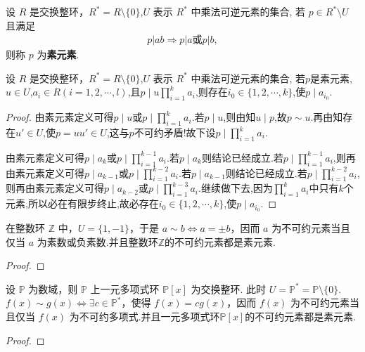 \documentclass[../../main.tex]{subfiles}%
\begin{document}
\begin{definition}
设 \( R \) 是交换整环，\( R^* = R \setminus \{0\} \),\( U \) 表示 \( R^* \) 中乘法可逆元素的集合, 若 \( p \in R^* \setminus U \) 且满足
\begin{align*}
p|ab \Rightarrow p|a \text{或} p|b,
\end{align*}
则称 \( p \) 为\textbf{素元素}.
\end{definition}

\begin{proposition}\label{proposition:素元素整除性质1}
设 \( R \) 是交换整环，\( R^* = R \setminus \{0\} \),\( U \) 表示 \( R^* \) 中乘法可逆元素的集合, 若$p$是素元素,$u\in U$,$a_i\in R(i=1,2,\cdots,l)$,且$p\mid u\prod_{i=1}^{k}a_i$,则存在$i_0\in \{1,2,\cdots,k\}$,使$p\mid a_{i_0}$.
\end{proposition}
\begin{proof}
由素元素定义可得$p\mid u$或$p\mid \prod_{i=1}^{k}a_i$.若$p\mid u$,则由知$u\mid p$,故$p\sim u$.再由知存在$u'\in U$,使$p=uu'\in U$,这与$p$不可约矛盾!故下设$p\mid \prod_{i=1}^{k}a_i$.

由素元素定义可得$p\mid a_k$或$p\mid \prod_{i=1}^{k-1}a_i$.若$p\mid a_k$则结论已经成立.若$p\mid \prod_{i=1}^{k-1}a_i$,则再由素元素定义可得$p\mid a_{k-1}$或$p\mid \prod_{i=1}^{k-2}a_i$.若$p\mid a_{k-1}$则结论已经成立.若$p\mid \prod_{i=1}^{k-2}a_i$,则再由素元素定义可得$p\mid a_{k-2}$或$p\mid \prod_{i=1}^{k-3}a_i$.继续做下去,因为$\prod_{i=1}^{k}a_i$中只有$k$个元素,所以必在有限步终止,故必存在$i_0\in \{1,2,\cdots,k\}$,使$p\mid a_{i_0}$.
\end{proof}

\begin{example}\label{example:抽象代数--例2.4.2}
在整数环 \( \mathbb{Z} \) 中，\( U = \{1, -1\} \)，于是 \( a \sim b \iff a = \pm b \)，因而 \( a \) 为不可约元素当且仅当 \( a \) 为素数或负素数.并且整数环$\mathbb{Z}$的不可约元素都是素元素.
\end{example}
\begin{proof}
    
\end{proof}

\begin{example}\label{example:抽象代数--例2.4.3}
设 \( \mathbb{P} \) 为数域，则 \( \mathbb{P} \) 上一元多项式环 \( \mathbb{P}[x] \) 为交换整环. 此时 \( U = \mathbb{P}^* = \mathbb{P} \setminus \{0\} \). \( f(x) \sim g(x) \iff \exists c \in \mathbb{P}^* \)，使得 \( f(x) = cg(x) \)，因而 \( f(x) \) 为不可约元素当且仅当 \( f(x) \) 为不可约多项式.并且一元多项式环\( \mathbb{P}[x] \)的不可约元素都是素元素.
\end{example}
\begin{proof}

\end{proof}
\end{document}

